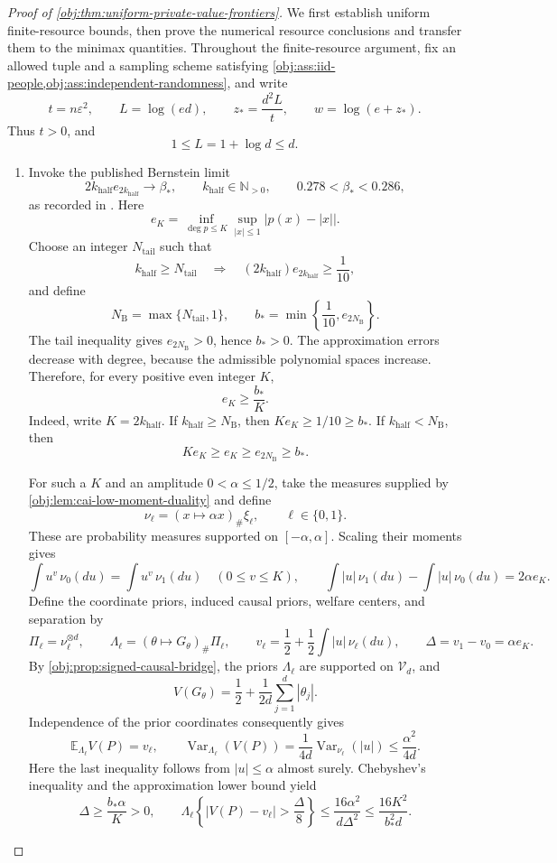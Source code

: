 \begin{proof}[Proof of \cref{obj:thm:uniform-private-value-frontiers}]
We first establish uniform finite-resource bounds, then prove the numerical resource conclusions and transfer them to the minimax quantities. Throughout the finite-resource argument, fix an allowed tuple and a sampling scheme satisfying \cref{obj:ass:iid-people,obj:ass:independent-randomness}, and write
\[
t=n\varepsilon^2,\qquad L=\log(ed),\qquad
z_*=\frac{d^2L}{t},\qquad w=\log(e+z_*).
\]
Thus \(t>0\), and
\[
1\le L=1+\log d\le d.
\]

\begin{enumerate}
\item
Invoke the published Bernstein limit
\[
2k_{\mathrm{half}} e_{2k_{\mathrm{half}}}\longrightarrow\beta_*,
\qquad k_{\mathrm{half}}\in\mathbb N_{>0},
\qquad 0.278<\beta_*<0.286,
\]
as recorded in \citep[Section 3.1, p.~8]{CaiLow2011Nonsmooth}. Here
\[
e_K=\inf_{\deg p\le K}\sup_{|x|\le1}\bigl|p(x)-|x|\bigr|.
\]
Choose an integer \(N_{\mathrm{tail}}\) such that
\[
k_{\mathrm{half}}\ge N_{\mathrm{tail}}
\quad\Longrightarrow\quad
(2k_{\mathrm{half}})e_{2k_{\mathrm{half}}}\ge\frac1{10},
\]
and define
\[
N_{\mathrm B}=\max\{N_{\mathrm{tail}},1\},
\qquad
b_*=\min\left\{\frac1{10},e_{2N_{\mathrm B}}\right\}.
\]
The tail inequality gives \(e_{2N_{\mathrm B}}>0\), hence \(b_*>0\).
The approximation errors decrease with degree, because the admissible polynomial spaces increase. Therefore, for every positive even integer \(K\),
\[
e_K\ge\frac{b_*}{K}.
\]
Indeed, write \(K=2k_{\mathrm{half}}\). If \(k_{\mathrm{half}}\ge N_{\mathrm B}\), then \(Ke_K\ge1/10\ge b_*\). If \(k_{\mathrm{half}}<N_{\mathrm B}\), then
\[
Ke_K\ge e_K\ge e_{2N_{\mathrm B}}\ge b_*.
\]

For such a \(K\) and an amplitude \(0<\alpha\le1/2\), take the measures supplied by \cref{obj:lem:cai-low-moment-duality} and define
\[
\nu_\ell=(x\mapsto\alpha x)_{\#}\xi_\ell,
\qquad \ell\in\{0,1\}.
\]
These are probability measures supported on \([-\alpha,\alpha]\). Scaling their moments gives
\[
\int u^v\,\nu_0(du)=\int u^v\,\nu_1(du)
\quad(0\le v\le K),
\qquad
\int |u|\,\nu_1(du)-\int |u|\,\nu_0(du)
=2\alpha e_K.
\]
Define the coordinate priors, induced causal priors, welfare centers, and separation by
\[
\Pi_\ell=\nu_\ell^{\otimes d},\qquad
\Lambda_\ell=(\theta\mapsto G_\theta)_{\#}\Pi_\ell,
\qquad
v_\ell=\frac12+\frac12\int|u|\,\nu_\ell(du),
\qquad
\Delta=v_1-v_0=\alpha e_K.
\]
By \cref{obj:prop:signed-causal-bridge}, the priors \(\Lambda_\ell\) are supported on \(\mathcal V_d\), and
\[
V(G_\theta)=\frac12+\frac1{2d}\sum_{j=1}^d|\theta_j|.
\]
Independence of the prior coordinates consequently gives
\[
\mathbb E_{\Lambda_\ell}V(P)=v_\ell,
\qquad
\operatorname{Var}_{\Lambda_\ell}(V(P))
=\frac1{4d}\operatorname{Var}_{\nu_\ell}(|u|)
\le\frac{\alpha^2}{4d}.
\]
Here the last inequality follows from \(|u|\le\alpha\) almost surely. Chebyshev's inequality and the approximation lower bound yield
\[
\Delta\ge\frac{b_*\alpha}{K}>0,
\qquad
\Lambda_\ell\!\left\{|V(P)-v_\ell|>\frac{\Delta}{8}\right\}
\le\frac{16\alpha^2}{d\Delta^2}
\le\frac{16K^2}{b_*^2d}.
\]


\end{enumerate}
\end{proof}
